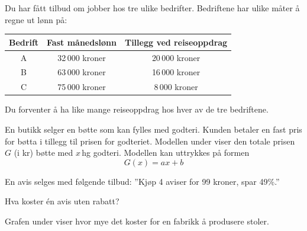 Du har fått tilbud om jobber hos tre ulike bedrifter.
Bedriftene har ulike måter å regne ut lønn på:
\begin{center}
	\begin{tabular}{|c|c|c|}
		\hline
		\textbf{Bedrift} & \textbf{Fast månedslønn} & \textbf{Tillegg ved reiseoppdrag} \\ \hline
		A & 32\,000 kroner & 20\,000 kroner \\ \hline
		B & 63\,000 kroner & 16\,000 kroner \\ \hline
		C & 75\,000 kroner & 8\,000 kroner \\ \hline
	\end{tabular}
\end{center}

Du forventer å ha like mange reiseoppdrag hos hver av de tre bedriftene.


En butikk selger en bøtte som kan fylles med godteri. Kunden betaler en fast pris for bøtta i tillegg til prisen for godteriet. Modellen under viser den totale prisen $G$ (i kr) bøtte med $x$\,hg godteri.
Modellen kan uttrykkes på formen
\[ G(x)=ax+b \]

En avis selges med følgende tilbud: ''Kjøp 4 aviser for 99 kroner, spar 49\%.''\os

Hva koster én avis uten rabatt?

Grafen under viser hvor mye det koster for en fabrikk å
produsere stoler.

